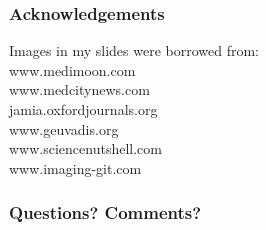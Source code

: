\documentclass[10pt,dvipsnames,table, notes]{beamer}
\begin{document}
\begin{frame}
\frametitle{Acknowledgements}
Images in my slides were borrowed from: \\
www.medimoon.com \\
www.medcitynews.com \\
jamia.oxfordjournals.org \\
www.geuvadis.org \\
www.sciencenutshell.com \\
www.imaging-git.com \\

\end{frame}

\begin{frame}
\frametitle{Questions? Comments?}

\end{frame}
\end{document}
